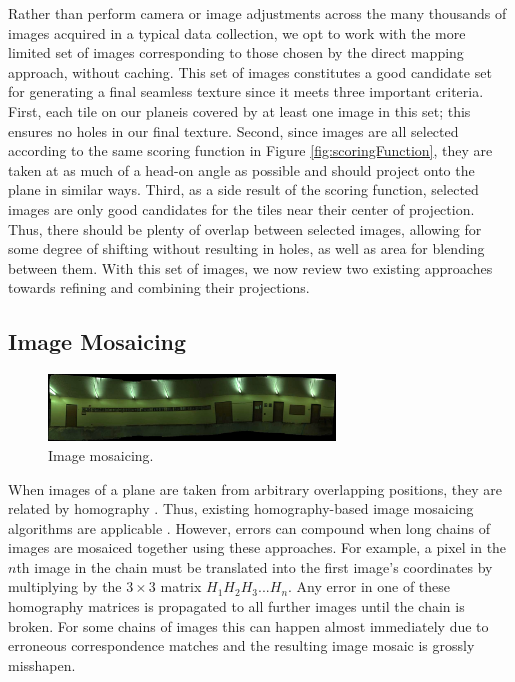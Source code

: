 \documentclass[10pt,twocolumn,letterpaper]{article}
\begin{document}
Rather than perform camera or image adjustments across the many
thousands of images acquired in a typical data collection, we opt to
work with the more limited set of images corresponding to those chosen
by the direct mapping approach, without caching. This set of images
constitutes a good candidate set for generating a final seamless
texture since it meets three important criteria. First, each tile on our planeis covered by at least one image in this set; this ensures no
holes in our final texture. Second, since images are all selected
according to the same scoring function in Figure
\ref{fig:scoringFunction}, they are taken at as much of a head-on
angle as possible and should project onto the plane in similar
ways. Third, as a side result of the scoring function, selected images
are only good candidates for the tiles near their center of
projection. Thus, there should be plenty of overlap between selected
images, allowing for some degree of shifting without resulting in
holes, as well as area for blending between them. With this set of
images, we now review two existing approaches towards refining and
combining their projections.

\subsection{Image Mosaicing}
\label{sec:imageMosaicing}
\begin{figure}
  \centering
  \includegraphics[width=3in]{panoMy.jpg}
  \caption{Image mosaicing. }
  \label{fig:mosaic}
\end{figure}


When images of a plane are taken from arbitrary overlapping positions,
they are related by homography \cite{hz}. Thus, existing
homography-based image mosaicing algorithms are applicable
\cite{brown2007automatic}. However, errors can compound when long
chains of images are mosaiced together using these approaches. For
example, a pixel in the $n$th image in the chain must be translated
into the first image's coordinates by multiplying by the $3\times3$
matrix $H_1 H_2 H_3 ... H_n$. Any error in one of these homography
matrices is propagated to all further images until the chain is
broken. For some chains of images this can happen almost immediately
due to erroneous correspondence matches and the resulting image mosaic
is grossly misshapen.
\end{document}
